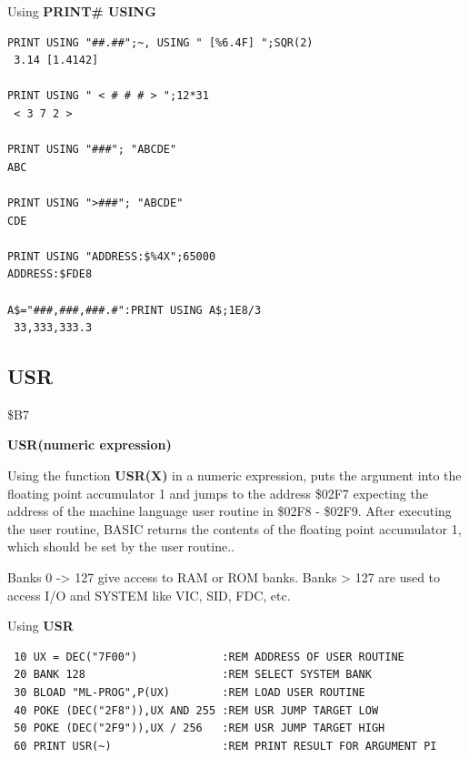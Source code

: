 \begin{description}[leftmargin=2cm,style=nextline]
\newpage
\item [Example:] Using {\bf PRINT\# USING}

\begin{tcolorbox}[colback=black,coltext=white]
\verbatimfont{\codefont}
\begin{verbatim}
PRINT USING "##.##";~, USING " [%6.4F] ";SQR(2)
 3.14 [1.4142]

PRINT USING " < # # # > ";12*31
 < 3 7 2 >

PRINT USING "###"; "ABCDE"
ABC

PRINT USING ">###"; "ABCDE"
CDE

PRINT USING "ADDRESS:$%4X";65000
ADDRESS:$FDE8

A$="###,###,###.#":PRINT USING A$;1E8/3
 33,333,333.3
\end{verbatim}
\end{tcolorbox}
\end{description}


\newpage
\subsection{USR}
\begin{description}[leftmargin=2cm,style=nextline]
\item [Token:] \$B7
\item [Format:] {\bf USR(numeric expression)}
\item [Usage:]  Using the function {\bf USR(X)} in a numeric
                expression, puts the argument into the
                floating point accumulator 1 and jumps to the
                address \$02F7 expecting the address of the
                machine language user routine in \$02F8 - \$02F9.
                After executing the user routine, BASIC returns
                the contents of the floating point accumulator 1,
                which should be set by the user routine..

\item [Remarks:] Banks 0 -> 127 give access to RAM or ROM banks.
                 Banks > 127 are used to access I/O and SYSTEM
                 like VIC, SID, FDC, etc.
\item [Example:] Using {\bf USR}

\begin{tcolorbox}[colback=black,coltext=white]
\verbatimfont{\codefont}
\begin{verbatim}
 10 UX = DEC("7F00")             :REM ADDRESS OF USER ROUTINE
 20 BANK 128                     :REM SELECT SYSTEM BANK
 30 BLOAD "ML-PROG",P(UX)        :REM LOAD USER ROUTINE
 40 POKE (DEC("2F8")),UX AND 255 :REM USR JUMP TARGET LOW
 50 POKE (DEC("2F9")),UX / 256   :REM USR JUMP TARGET HIGH
 60 PRINT USR(~)                 :REM PRINT RESULT FOR ARGUMENT PI
\end{verbatim}
\end{tcolorbox}
\end{description}

